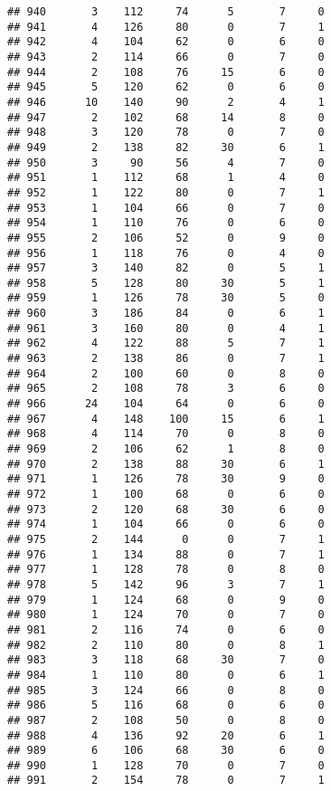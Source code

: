 \documentclass[
]{article}
\begin{document}
\begin{verbatim}
## 940       3    112     74      5       7     0
## 941       4    126     80      0       7     1
## 942       4    104     62      0       6     0
## 943       2    114     66      0       7     0
## 944       2    108     76     15       6     0
## 945       5    120     62      0       6     0
## 946      10    140     90      2       4     1
## 947       2    102     68     14       8     0
## 948       3    120     78      0       7     0
## 949       2    138     82     30       6     1
## 950       3     90     56      4       7     0
## 951       1    112     68      1       4     0
## 952       1    122     80      0       7     1
## 953       1    104     66      0       7     0
## 954       1    110     76      0       6     0
## 955       2    106     52      0       9     0
## 956       1    118     76      0       4     0
## 957       3    140     82      0       5     1
## 958       5    128     80     30       5     1
## 959       1    126     78     30       5     0
## 960       3    186     84      0       6     1
## 961       3    160     80      0       4     1
## 962       4    122     88      5       7     1
## 963       2    138     86      0       7     1
## 964       2    100     60      0       8     0
## 965       2    108     78      3       6     0
## 966      24    104     64      0       6     0
## 967       4    148    100     15       6     1
## 968       4    114     70      0       8     0
## 969       2    106     62      1       8     0
## 970       2    138     88     30       6     1
## 971       1    126     78     30       9     0
## 972       1    100     68      0       6     0
## 973       2    120     68     30       6     0
## 974       1    104     66      0       6     0
## 975       2    144      0      0       7     1
## 976       1    134     88      0       7     1
## 977       1    128     78      0       8     0
## 978       5    142     96      3       7     1
## 979       1    124     68      0       9     0
## 980       1    124     70      0       7     0
## 981       2    116     74      0       6     0
## 982       2    110     80      0       8     1
## 983       3    118     68     30       7     0
## 984       1    110     80      0       6     1
## 985       3    124     66      0       8     0
## 986       5    116     68      0       6     0
## 987       2    108     50      0       8     0
## 988       4    136     92     20       6     1
## 989       6    106     68     30       6     0
## 990       1    128     70      0       7     0
## 991       2    154     78      0       7     1

\end{verbatim}
\end{document}

